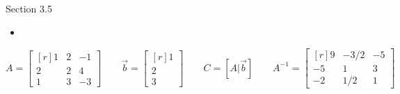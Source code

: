 \documentclass{problemset}
\newcommand{\mat}[1]{\begin{bmatrix*}[r]#1\end{bmatrix*}}
\begin{document}
\begin{lesson}
	\newpage

	Section 3.5

	\begin{itemize}
		\item 
	\end{itemize}


	\newpage
\end{lesson}
	\question
	\[
		A=\mat{1&2&-1\\2&2&4\\1&3&-3}\qquad
		\vec b=\mat{1\\2\\3}\qquad
		C=[A|\vec b]\qquad
		A^{-1}=\mat{9&-3/2&-5\\-5&1&3\\-2&1/2&1}
	\]
\end{document}
